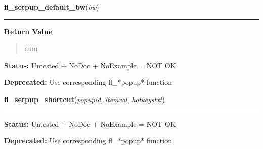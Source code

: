     \label{xformslib:deprecated:fl_setpup_default_bw}

    \vspace{0.5ex}

\hspace{.8\funcindent}\begin{boxedminipage}{\funcwidth}

    \raggedright \textbf{fl\_setpup\_default\_bw}(\textit{bw})

    \vspace{-1.5ex}

    \rule{\textwidth}{0.5\fboxrule}
\setlength{\parskip}{2ex}
\setlength{\parskip}{1ex}
      \textbf{Return Value}
    \vspace{-1ex}

      \begin{quote}
      num

      \end{quote}

\textbf{Status:} Untested + NoDoc + NoExample = NOT OK



\textbf{Deprecated:} Use corresponding fl\_*popup* function



    \end{boxedminipage}

    \label{xformslib:deprecated:fl_setpup_shortcut}

    \vspace{0.5ex}

\hspace{.8\funcindent}\begin{boxedminipage}{\funcwidth}

    \raggedright \textbf{fl\_setpup\_shortcut}(\textit{popupid}, \textit{itemval}, \textit{hotkeystxt})

    \vspace{-1.5ex}

    \rule{\textwidth}{0.5\fboxrule}
\setlength{\parskip}{2ex}
\setlength{\parskip}{1ex}
\textbf{Status:} Untested + NoDoc + NoExample = NOT OK



\textbf{Deprecated:} Use corresponding fl\_*popup* function



    \end{boxedminipage}


